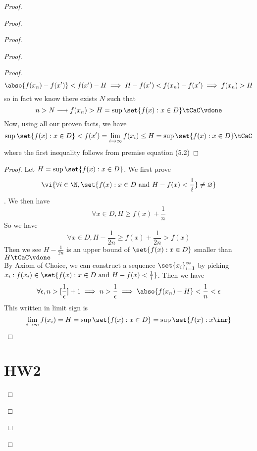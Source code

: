 \documentclass{report}
\begin{document}
\begin{proof}
\begin{proof}
\begin{proof}
\begin{proof}
\begin{proof}
\begin{equation*}
\abso{f(x_n)-f(x')}<f(x')-H\implies H-f(x')< f(x_n)-f(x')\implies f(x_n)>H
\end{equation*}
so in fact we know there exists $N$ such that 
\begin{equation*}
n>N \longrightarrow f(x_n)>H= \sup \set{f(x): x \in D}\tCaC\vdone
\end{equation*}
Now, using all our proven facts, we have
\begin{equation*}
\sup \set{f(x): x\in D}<f(x')=\lim_{i\to \infty }f(x_i)\leq H=\sup \set{f(x): x \in D}\tCaC
\end{equation*}
where the first inequality follows from premise equation (5.2) 
\end{proof}
\begin{proof}
Let $H=\sup \set{f(x): x \in D}$. We first prove
\begin{equation*}
\vi{\forall i \in \N, \set{f(x): x \in D\text{ and }H-f(x)<\frac{1}{i}}\neq \varnothing}
\end{equation*}
. We then have
\begin{equation*}
\forall x\in D, H\geq f(x)+\frac{1}{n}
\end{equation*}
So we have
\begin{equation*}
\forall x\in D, H-\frac{1}{2n}\geq f(x)+\frac{1}{2n}>f(x)
\end{equation*}
Then we see $H-\frac{1}{2n}$ is an upper bound of $\set{f(x): x \in D}$ smaller than $H\tCaC\vdone$\\

By Axiom of Choice, we can construct a sequence $\set{x_i}_{i=1}^\infty$ by picking $x_i: f(x_i)\in \set{f(x):x \in D\text{ and }H-f(x)<\frac{1}{i}}$. Then we have
\begin{equation*}
\forall \epsilon, n> [\frac{1}{\epsilon }]+1\implies n>\frac{1}{\epsilon }\implies \abso{f(x_n)-H}<\frac{1}{n}<\epsilon 
\end{equation*}
This written in limit sign is 
\begin{equation*}
\lim_{i\to \infty}f(x_i)=H=\sup \set{f(x): x\in D}=\sup \set{f(x):x \inr}
\end{equation*}
\end{proof}
\section{HW2}
\begin{question}{}{}


\end{question}
\end{proof}
\end{proof}
\end{proof}
\end{proof}
\end{document}
